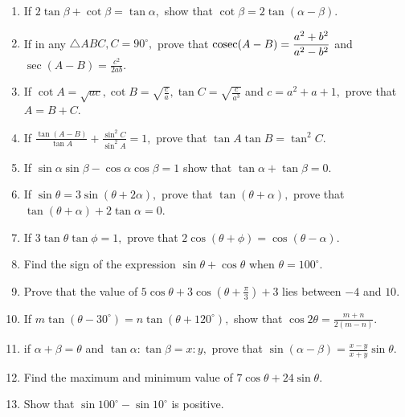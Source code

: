 \begin{enumerate}[resume]
\item If $2\tan\beta + \cot \beta = \tan\alpha,$ show that $\cot \beta = 2\tan(\alpha - \beta)$.

\item If in any $\triangle ABC, C = 90^\circ,$ prove that ${\rm cosec}(A - B) = \frac{a^2 + b^2}{a^2 - b^2}$ and $\sec(A
    - B) = \frac{c^2}{2ab}$.

\item If $\cot A = \sqrt{ac}, \cot B = \sqrt{\frac{c}{a}}, \tan C = \sqrt{\frac{c}{a^3}}$ and $c = a^2 + a + 1,$ prove
    that $A = B + C$.

\item If $\frac{\tan(A - B)}{\tan A} + \frac{\sin^2C}{\sin^2A} = 1,$ prove that $\tan A\tan B = \tan^2 C$.

\item If $\sin\alpha\sin\beta - \cos\alpha\cos\beta = 1$ show that $\tan\alpha + \tan\beta = 0$.

\item If $\sin\theta = 3\sin(\theta + 2\alpha),$ prove that $\tan(\theta + \alpha),$ prove that $\tan(\theta +
    \alpha) + 2\tan\alpha = 0$.

\item If $3\tan\theta\tan\phi = 1,$ prove that $2\cos(\theta + \phi) = \cos(\theta - \alpha)$.

\item Find the sign of the expression $\sin\theta + \cos\theta$ when $\theta = 100^\circ$.

\item Prove that the value of $5\cos\theta + 3\cos\left(\theta + \frac{\pi}{3}\right) + 3$ lies between $-4$ and
    $10$.

\item If $m\tan(\theta - 30^\circ) = n\tan(\theta + 120^\circ),$ show that $\cos2\theta = \frac{m + n}{2(m - n)}$.

\item if $\alpha + \beta = \theta$ and $\tan\alpha:\tan\beta = x:y,$ prove that $\sin(\alpha - \beta) = \frac{x -
    y}{x + y}\sin\theta$.

\item Find the maximum and minimum value of $7\cos\theta + 24\sin\theta$.

\item Show that $\sin 100^\circ - \sin 10^\circ$ is positive.
\end{enumerate}
